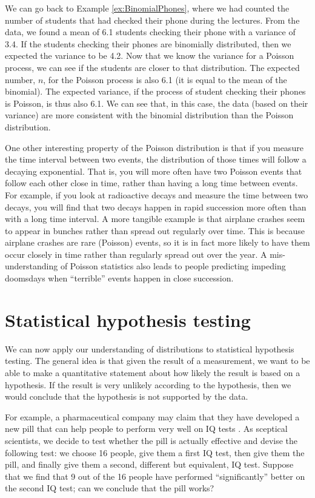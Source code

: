 We can go back to Example \ref{ex:BinomialPhones}, where we had counted the number of students that had checked their phone during the lectures. From the data, we found a mean of 6.1 students checking their phone with a variance of 3.4. If the students checking their phones are binomially distributed, then we expected the variance to be 4.2. Now that we know the variance for a Poisson process, we can see if the students are closer to that distribution. The expected number, $n$, for the Poisson process is also 6.1 (it is equal to the mean of the binomial). The expected variance, if the process of student checking their phones is Poisson, is thus also 6.1. We can see that, in this case, the data (based on their variance) are more consistent with the binomial distribution than the Poisson distribution.

One other interesting property of the Poisson distribution is that if you measure the time interval between two events, the distribution of those times will follow a decaying exponential. That is, you will more often have two Poisson events that follow each other close in time, rather than having a long time between events. For example, if you look at radioactive decays and measure the time between two decays, you will find that two decays happen in rapid succession more often than with a long time interval. A more tangible example is that airplane crashes seem to appear in bunches rather than spread out regularly over time. This is because airplane crashes are rare (Poisson) events, so it is in fact more likely to have them occur closely in time rather than regularly spread out over the year. A mis-understanding of Poisson statistics also leads to people predicting impeding doomsdays when ``terrible'' events happen in close succession. 

\section{Statistical hypothesis testing}
We can now apply our understanding of distributions to statistical hypothesis testing. The general idea is that given the result of a measurement, we want to be able to make a quantitative statement about how likely the result is based on a hypothesis. If the result is very unlikely according to the hypothesis, then we would conclude that the hypothesis is not supported by the data. 

For example, a pharmaceutical company may claim that they have developed a new pill that can help people to perform very well on IQ tests . As sceptical scientists, we decide to test whether the pill is actually effective and devise the following test: we choose 16 people, give them a first IQ test, then give them the pill, and finally give them a second, different but equivalent, IQ test. Suppose that we find that 9 out of the 16 people have performed ``significantly'' better on the second IQ test; can we conclude that the pill works?

